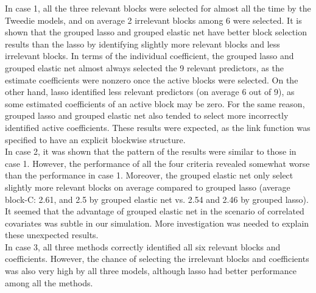 \documentclass[paper=a4, fontsize=11pt]{scrartcl} %
\begin{document}
In case 1, all the three relevant blocks were selected for almost all the time by the Tweedie models, and on average 2 irrelevant blocks among 6 were selected. It is shown that the grouped lasso and grouped elastic net have better block selection results than the lasso by identifying slightly more relevant blocks and less irrelevant blocks. In terms of the individual coefficient, the grouped lasso and grouped elastic net almost always selected the 9 relevant predictors, as the estimate coefficients were nonzero once the active blocks were selected. On the other hand, lasso identified less relevant predictors (on average 6 out of 9), as some estimated coefficients of an active block may be zero. For the same reason, grouped lasso and grouped elastic net also tended to select more incorrectly identified active coefficients. These results were expected, as the link function was specified to have an explicit blockwise structure. \\

In case 2, it was shown that the pattern of the results were similar to those in case 1. However, the performance of all the four criteria revealed somewhat worse than the performance in case 1. Moreover, the grouped elastic net only select slightly more relevant blocks on average compared to grouped lasso (average block-C: 2.61, and 2.5 by grouped elastic net vs. 2.54 and 2.46 by grouped lasso). It seemed that the advantage of grouped elastic net in the scenario of correlated covariates was subtle in our simulation. More investigation was needed to explain these unexpected results.\\

In case 3, all three methods correctly identified all six relevant blocks and coefficients. However, the chance of selecting the irrelevant blocks and coefficients was also very high by all three models, although lasso had better performance among all the methods.\\
\end{document}
